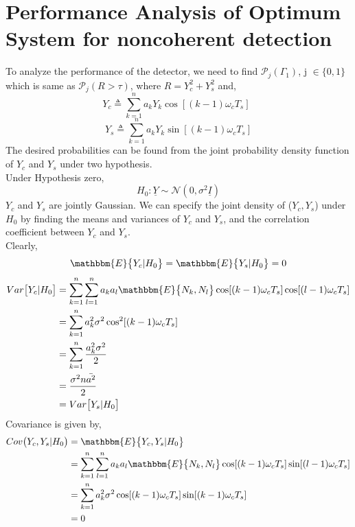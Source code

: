 \documentclass[a4paper,english,12pt]{article}
\begin{document}
\section{Performance Analysis of Optimum System for noncoherent detection}
To analyze the performance of the detector, we need to find  $\mathcal{P}_j(\Gamma_1)$, j $\in \{0,1\}$ which is same as $\mathcal{P}_j(R>\tau)$, where $R=Y_c^2+Y_s^2$ and,
\begin{equation*}
Y_c\triangleq\sum_{k=1}^{n}a_k Y_k\cos[(k-1)\omega_c T_s] \ \ 
\end{equation*}
\begin{equation*}
Y_s\triangleq\sum_{k=1}^{n}a_k Y_k\sin[(k-1)\omega_c T_s]
\end{equation*}
The desired probabilities can be found from the joint probability density function of $Y_c$ and $Y_s$ under two hypothesis. \\
Under Hypothesis zero,
\begin{equation*}
H_0: \underline{Y} \sim \mathcal{N}(0,\sigma^2\underline{I})
\end{equation*}
$Y_c$ and $Y_s$ are jointly Gaussian. We can specify the joint density of ($Y_c,Y_s$) under $H_0$ by finding the means and variances of $Y_c$ and $Y_s$, and the correlation coefficient between $Y_c$ and $Y_s$.\\
Clearly,
$$\mathbbm{E}\big\{Y_c|H_0\big\} = \mathbbm{E}\big\{Y_s|H_0\big\} = 0$$
\begin{equation*}
\begin{aligned}
Var\big[Y_c|H_0\big]
&=\sum_{k=1}^{n}\sum_{l=1}^{n}a_k a_l\mathbbm{E}\big\{N_k,N_l\big\}\cos[(k-1)\omega_c T_s]\cos[(l-1)\omega_c T_s] \\
&= \sum_{k=1}^{n}a_k^2\sigma^2\cos^2[(k-1)\omega_c T_s] \\
&= \sum_{k=1}^{n}\frac{a_k^2\sigma^2}{2} \\
&= \frac{\sigma^2n\bar{a^2}}{2}\\
&= Var\big[Y_s|H_0\big]
\end{aligned}
\end{equation*}
Covariance is given by,
\begin{equation*}
\begin{aligned}
Cov\big(Y_c,Y_s|H_0\big) &=\mathbbm{E}\big\{Y_c,Y_s|H_0\big\}\\
&=\sum_{k=1}^{n}\sum_{l=1}^{n}a_k a_l\mathbbm{E}\big\{N_k,N_l\big\}\cos[(k-1)\omega_c T_s]\sin[(l-1)\omega_c T_s] \\
&=\sum_{k=1}^{n}a_k^2\sigma^2\cos[(k-1)\omega_c T_s]\sin[(k-1)\omega_c T_s] \\
&= 0
\end{aligned}
\end{equation*}
\end{document}
